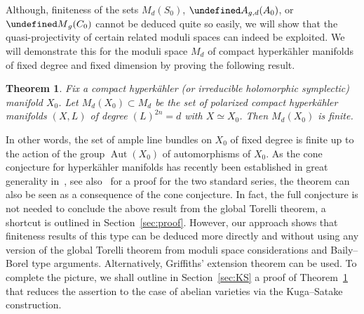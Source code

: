 \documentclass[11pt]{article}
\newtheorem{theo}{Theorem}[section]
\theoremstyle{definition}
\numberwithin{equation}{section}
\numberwithin{figure}{section}
\numberwithin{table}{section}
\let\cal\undefined
\DeclareMathOperator{\Aut}{Aut}
\newcommand{\cal}{\mathcal}
\newcommand{\ka}{{\cal A}}
\newcommand{\km}{{\cal M}}
\renewcommand{\cong}{\simeq}
\begin{document}
Although, finiteness of the sets $M_d(S_0)$, $\ka_{g,d}(A_0)$, or $\km_g(C_0)$ cannot be deduced quite so easily, we will show that the quasi-projectivity of certain related moduli spaces can indeed be exploited. We will demonstrate this for the moduli space $M_d$ of compact hyperk\"ahler manifolds of fixed degree and fixed dimension by proving the following result.

\begin{theo}\label{thm:HK}
Fix a compact hyperk\"ahler (or irreducible holomorphic symplectic) manifold $X_0$. Let $M_d(X_0)\subset {M}_{d}$ be the set of polarized compact hyperk\"ahler manifolds $(X,L)$ of degree $(L)^{2n}=d$ with $X\cong X_0$. Then $M_d(X_0)$ is finite.
\end{theo}

In other words, the set of ample line bundles on $X_0$ of fixed degree is finite up to the action of the group $\Aut(X_0)$ of automorphisms of $X_0$. As the cone conjecture for hyperk\"ahler manifolds has recently been established in great generality in~\cite{AmVerb,AmVerb2}, see also~\cite{MarYos} for a proof for the two standard series, the theorem can also be seen as a consequence of the cone conjecture. In fact, the full conjecture is not needed to conclude the above result from the global Torelli theorem, a shortcut is outlined in Section~\ref{sec:proof}. However, our approach shows that finiteness results of this type can be deduced more directly and without using any version of the global Torelli theorem from moduli space considerations and Baily--Borel type arguments. Alternatively, Griffiths' extension theorem can be used. To complete the picture, we shall outline in Section~\ref{sec:KS} a proof of Theorem~\ref{thm:HK} that reduces the assertion to the case of abelian varieties via the Kuga--Satake construction.

\pagebreak
\end{document}
